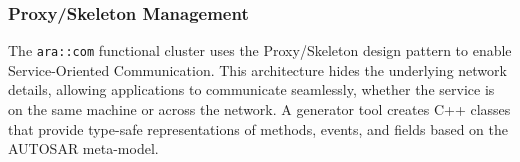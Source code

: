 



\subsubsection{Proxy/Skeleton Management}

The \texttt{ara::com} functional cluster uses the Proxy/Skeleton design pattern to enable Service-Oriented Communication. This architecture hides the underlying network details, allowing applications to communicate seamlessly, whether the service is on the same machine or across the network. A generator tool creates C++ classes that provide type-safe representations of methods, events, and fields based on the AUTOSAR meta-model.

